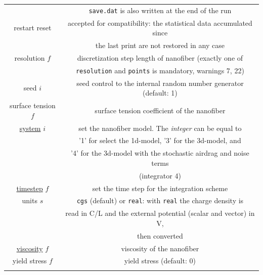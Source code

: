 \begin{longtable}{cc}
 & \texttt{save.dat} is also written at the end of the run\tabularnewline
restart reset  & accepted for compatibility: the statistical data accumulated since\tabularnewline
 & the last print are not restored in any case\tabularnewline
resolution $f$  & discretization step length of nanofiber (exactly one of\tabularnewline
 & \texttt{resolution} and \texttt{points} is mandatory, warnings 7, 22)\tabularnewline
seed $i$  & seed control to the internal random number generator (default: 1)\tabularnewline
surface tension $f$  & surface tension coefficient of the nanofiber\tabularnewline
\uline{system} $i$  & set the nanofiber model. The \textit{integer} can be equal to \tabularnewline
 & \quad{}'1' for select the 1d-model, '3' for the 3d-model, and\tabularnewline
 &  '4' for the 3d-model with the stochastic airdrag and noise terms\tabularnewline
 & \quad{}(integrator 4)\tabularnewline
\uline{timestep} $f$  & set the time step for the integration scheme\tabularnewline
units $s$  & \texttt{cgs} (default) or \texttt{real}: with \texttt{real} the charge density is\tabularnewline
 & \quad{}read in C/L and the external potential (scalar and vector) in V,\tabularnewline
 & \quad{}then converted\tabularnewline
\uline{viscosity} $f$  & viscosity of the nanofiber\tabularnewline
yield stress $f$  & yield stress (default: 0)\tabularnewline
\hline
\label{tab:inputlist}  & \tabularnewline
\end{longtable}


